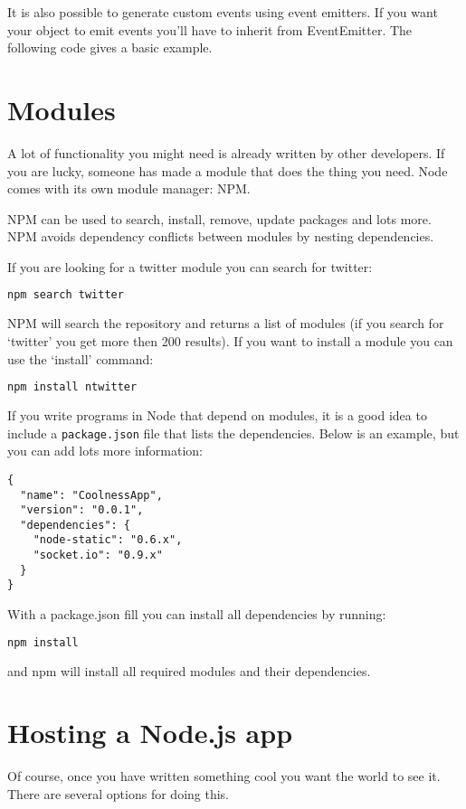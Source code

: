 \documentclass[a4paper]{report}
\begin{document}


\noindent It is also possible to generate custom events using event emitters. If you want your object to emit events you'll have to inherit from EventEmitter. The following code gives a basic example.



\section*{Modules}
A lot of functionality you might need is already written by other developers. If you are lucky, someone has made a module that does the thing you need. Node comes with its own module manager: NPM. 

NPM can be used to search, install, remove, update packages and lots more. NPM avoids dependency conflicts between modules by nesting dependencies.

If you are looking for a twitter module you can search for twitter:
\begin{lstlisting}[language=bash]
npm search twitter
\end{lstlisting}
NPM will search the repository and returns a list of modules (if you search for `twitter' you get more then 200 results). If you want to install a module you can use the `install' command: 
\begin{lstlisting}[language=bash]
npm install ntwitter
\end{lstlisting}
If you write programs in Node that depend on modules, it is a good idea to include a \texttt{package.json} file that lists the dependencies. Below is an example, but you can add lots more information:
\begin{lstlisting}
{
  "name": "CoolnessApp",
  "version": "0.0.1",
  "dependencies": {
    "node-static": "0.6.x",
    "socket.io": "0.9.x"
  }
}
\end{lstlisting}

\noindent With a package.json fill you can install all dependencies by running:
\begin{lstlisting}[language=bash]
npm install
\end{lstlisting}
\noindent and npm will install all required modules and their dependencies.

\section*{Hosting a Node.js app}
Of course, once you have written something cool you want the world to see it. There are several options for doing this.
\end{document}
